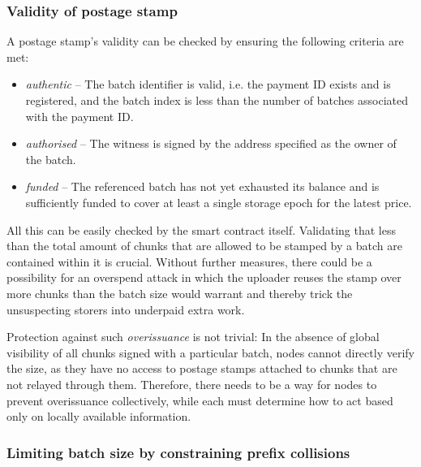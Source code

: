 \subsubsection{Validity of postage stamp}

A postage stamp's validity can be checked by ensuring the following criteria are met:

\begin{itemize}
\item \emph{authentic} -- The batch identifier is valid, i.e. the payment ID exists and is registered, and the batch index is less than the number of batches associated with the payment ID.
\item \emph{authorised} -- The witness is signed by the address specified as the owner of the batch.
\item \emph{funded} -- The referenced batch has not yet exhausted its balance and is sufficiently funded to cover at least a single storage epoch for the latest  price.
\end{itemize}

All this can be easily checked by the smart contract itself. Validating that less than the total amount of chunks that are allowed to be stamped by a batch are contained within it is crucial. Without further measures, there could be a possibility for an overspend attack in which the uploader reuses the stamp over more chunks than the batch size would warrant and thereby trick the unsuspecting storers into underpaid extra work. 

Protection against such \emph{overissuance} is not trivial: In the absence of global visibility of all chunks signed with a particular batch, nodes cannot directly verify the size, as they have no access to postage stamps attached to chunks that are not relayed through them. Therefore, there needs to be a way for nodes to prevent overissuance collectively, while each must determine how to act based only on locally available information.

\subsubsection{Limiting batch size by constraining prefix collisions}

